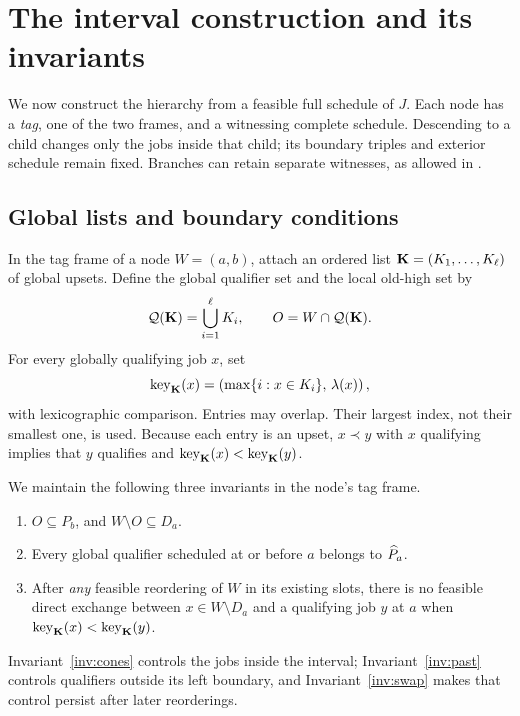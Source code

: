 \section{The interval construction and its invariants}\label{sec:construction}

We now construct the hierarchy from a feasible full schedule of \(J\).
Each node has a \emph{tag}, one of the two frames, and a witnessing
complete schedule. Descending to a child changes only the jobs inside
that child; its boundary triples and exterior schedule remain fixed.
Branches can retain separate witnesses, as allowed in
.

\subsection{Global lists and boundary conditions}

In the tag frame of a node \(W=(a,b)\), attach an ordered list
\(\mathbf K=(K_1,\ldots,K_\ell)\) of global upsets.
Define the global qualifier set and the local old-high set by
\[
 \mathcal Q(\mathbf K)=\bigcup_{i=1}^{\ell}K_i,
 \qquad O=W\cap\mathcal Q(\mathbf K).
\]
For every globally qualifying job \(x\), set
\begin{equation}
 \operatorname{key}_{\mathbf K}(x)=
 \left(\max\{i:x\in K_i\},\,\lambda(x)\right),
 \label{eq:key}
\end{equation}
with lexicographic comparison. Entries may overlap. Their largest index,
not their smallest one, is used.
Because each entry is an upset, \(x\prec y\) with \(x\) qualifying
implies that \(y\) qualifies and
\(\operatorname{key}_{\mathbf K}(x)<\operatorname{key}_{\mathbf K}(y)\).

We maintain the following three invariants in the node's tag frame.
\begin{enumerate}[label=\textup{(I\arabic*)},ref=I\arabic*]
 \item\label{inv:cones}
 \(O\subseteq P_b\), and \(W\setminus O\subseteq D_a\).
 \item\label{inv:past}
 Every global qualifier scheduled at or before \(a\) belongs to
 \(\widehat P_{a}\).
 \item\label{inv:swap}
 After \emph{any} feasible reordering of \(W\) in its existing slots,
 there is no feasible direct exchange between
 \(x\in W\setminus D_a\) and a qualifying job \(y\) at \(a\) when
 \(\operatorname{key}_{\mathbf K}(x)<\operatorname{key}_{\mathbf K}(y)\).
\end{enumerate}
Invariant~\ref{inv:cones} controls the jobs inside the interval;
Invariant~\ref{inv:past} controls qualifiers outside its left boundary,
and Invariant~\ref{inv:swap} makes that control persist after later
reorderings.

